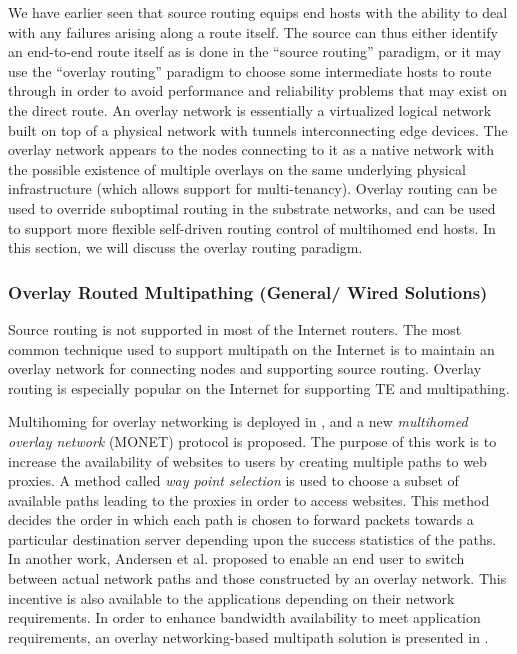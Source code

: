 \documentclass[10pt]{IEEEtran}
\begin{document}
We have earlier seen that source routing equips end hosts with the ability to deal with any failures arising along a route itself. The source can thus either identify an end-to-end route itself as is done in the ``source routing'' paradigm, or it may use the ``overlay routing'' paradigm to choose some intermediate hosts to route through in order to avoid performance and reliability problems that may exist on the direct route. An overlay network is essentially a virtualized logical network built on top of a physical network with tunnels interconnecting edge devices. The overlay network appears to the nodes connecting to it as a native network with the possible existence of multiple overlays on the same underlying physical infrastructure (which allows support for multi-tenancy). Overlay routing can be used to override suboptimal routing in the substrate networks, and can be used to support more flexible self-driven routing control of multihomed end hosts. In this section, we will discuss the overlay routing paradigm.  



\vspace{2mm}
\subsubsection{Overlay Routed Multipathing (General/ Wired Solutions)}
\label{subsub:w_g_overlay}

Source routing is not supported in most of the Internet routers. The most common technique used to support multipath on the Internet is to maintain an overlay network for connecting nodes and supporting source routing. Overlay routing is especially popular on the Internet for supporting TE and multipathing.

Multihoming for overlay networking is deployed in \cite{andersen2005improving}, and a new \textit{multihomed overlay network} (MONET) protocol is proposed. The purpose of this work is to increase the availability of websites to users by creating multiple paths to web proxies. A method called \textit{way point selection} is used to choose a subset of available paths leading to the proxies in order to access websites. This method decides the order in which each path is chosen to forward packets towards a particular destination server depending upon the success statistics of the paths. In another work, Andersen et al. \cite{andersen2001case} proposed to enable an end user to switch between actual network paths and those constructed by an overlay network. This incentive is also available to the applications depending on their network requirements. In order to enhance bandwidth availability to meet application requirements, an overlay networking-based multipath solution is presented in \cite{lee2008bandwidth}.
\end{document}
